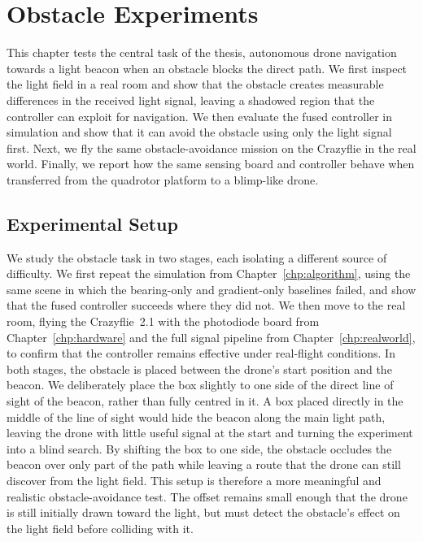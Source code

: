 \chapter{Obstacle Experiments}
\label{chp:obstacle}

This chapter tests the central task of the thesis, autonomous drone navigation towards a light beacon when an obstacle blocks the direct path. We first inspect the light field in a real room and show that the obstacle creates measurable differences in the received light signal, leaving a shadowed region that the controller can exploit for navigation. We then evaluate the fused controller in simulation and show that it can avoid the obstacle using only the light signal first. Next, we fly the same obstacle-avoidance mission on the Crazyflie in the real world. Finally, we report how the same sensing board and controller behave when transferred from the quadrotor platform to a blimp-like drone.


\section{Experimental Setup}
\label{sec:obstacle-setup}

We study the obstacle task in two stages, each isolating a different source of difficulty. We first repeat the simulation from Chapter~\ref{chp:algorithm}, using the same scene in which the bearing-only and gradient-only baselines failed, and show that the fused controller succeeds where they did not. We then move to the real room, flying the Crazyflie~2.1 with the photodiode board from Chapter~\ref{chp:hardware} and the full signal pipeline from Chapter~\ref{chp:realworld}, to confirm that the controller remains effective under real-flight conditions. In both stages, the obstacle is placed between the drone's start position and the beacon. We deliberately place the box slightly to one side of the direct line of sight of the beacon, rather than fully centred in it. A box placed directly in the middle of the line of sight would hide the beacon along the main light path, leaving the drone with little useful signal at the start and turning the experiment into a blind search. By shifting the box to one side, the obstacle occludes the beacon over only part of the path while leaving a route that the drone can still discover from the light field. This setup is therefore a more meaningful and realistic obstacle-avoidance test. The offset remains small enough that the drone is still initially drawn toward the light, but must detect the obstacle's effect on the light field before colliding with it.


